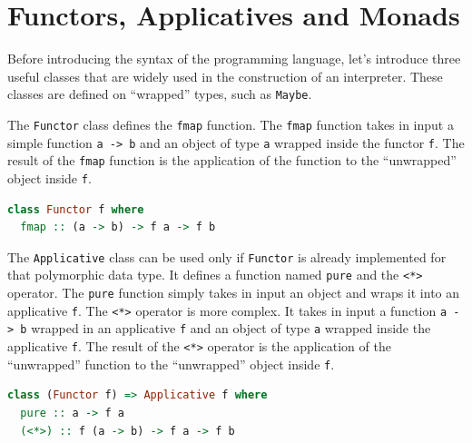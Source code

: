 \documentclass[12pt,a4paper]{article}
\begin{document}
\section*{Functors, Applicatives and Monads}
Before introducing the syntax of the programming language, let's introduce three useful classes that are widely used in the construction of an interpreter.
These classes are defined on ``wrapped'' types, such as \texttt{Maybe}.

The \texttt{Functor} class defines the \texttt{fmap} function.
The \texttt{fmap} function takes in input a simple function \texttt{a -> b} and an object of type \texttt{a} wrapped inside the functor \texttt{f}.
The result of the \texttt{fmap} function is the application of the function to the ``unwrapped'' object inside \texttt{f}.
\begin{lstlisting}[language=Haskell, style=custom-style]
class Functor f where
  fmap :: (a -> b) -> f a -> f b
\end{lstlisting}

The \texttt{Applicative} class can be used only if \texttt{Functor} is already implemented for that polymorphic data type.
It defines a function named \texttt{pure} and the \texttt{<*>} operator.
The \texttt{pure} function simply takes in input an object and wraps it into an applicative \texttt{f}.
The \texttt{<*>} operator is more complex.
It takes in input a function \texttt{a -> b} wrapped in an applicative \texttt{f} and an object of type \texttt{a} wrapped inside the applicative \texttt{f}.
The result of the \texttt{<*>} operator is the application of the ``unwrapped'' function to the ``unwrapped'' object inside \texttt{f}.
\begin{lstlisting}[language=Haskell, style=custom-style]
class (Functor f) => Applicative f where
  pure :: a -> f a
  (<*>) :: f (a -> b) -> f a -> f b
\end{lstlisting}
\end{document}
